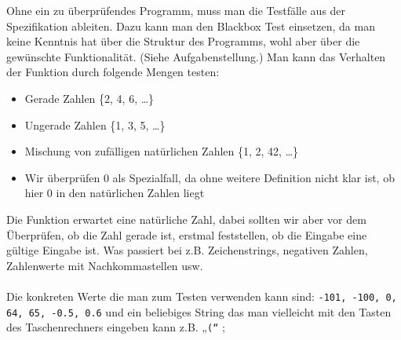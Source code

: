 Ohne ein zu überprüfendes Programm, muss man die Testfälle aus der Spezifikation ableiten.
Dazu kann man den Blackbox Test einsetzen, da man keine Kenntnis hat über die Struktur des Programms, wohl aber über die gewünschte Funktionalität.
(Siehe Aufgabenstellung.) Man kann das Verhalten der Funktion durch folgende Mengen testen:
\begin{itemize}
\item Gerade Zahlen \{2, 4, 6, …\}
\item Ungerade Zahlen \{1, 3, 5, …\}
\item Mischung von zufälligen natürlichen Zahlen \{1, 2, 42, …\}
\item Wir überprüfen 0 als Spezialfall, da ohne weitere Definition nicht klar ist, ob hier 0 in den natürlichen Zahlen liegt
\end{itemize}
Die Funktion erwartet eine natürliche Zahl, dabei sollten wir aber vor dem Überprüfen,
ob die Zahl gerade ist, erstmal feststellen, ob die Eingabe eine gültige Eingabe ist.
Was passiert bei z.B. Zeichenstrings, negativen Zahlen, Zahlenwerte mit Nachkommastellen usw.\\ \ \\
Die konkreten Werte die man zum Testen verwenden kann sind: \texttt{-101, -100, 0, 64, 65, -0.5, 0.6}
und ein beliebiges String das man vielleicht mit den Tasten des Taschenrechners eingeben kann z.B. „\texttt{(“} ;